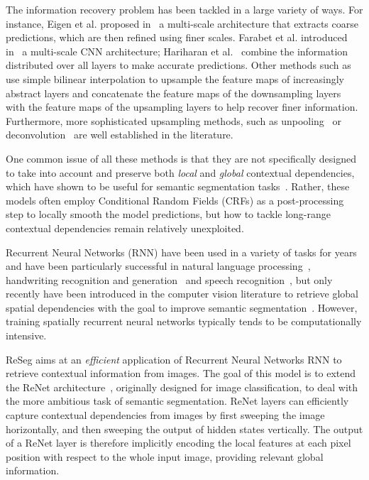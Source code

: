The information recovery problem has been tackled in a large variety of ways.
For instance, Eigen et al. proposed in~\cite{Eigen2015} a multi-scale
architecture that extracts coarse predictions, which are then refined using
finer scales. Farabet et al. introduced in~\cite{Farabet:2013} a multi-scale
CNN architecture; Hariharan et al.~\cite{Hariharan2015} combine the information
distributed over all layers to make accurate predictions. Other methods such
as~\cite{long2014fully,badrinarayanan2015segnet} use simple bilinear
interpolation to upsample the feature maps of increasingly abstract layers and
\cite{Ronneberger2015} concatenate the feature maps of the downsampling layers
with the feature maps of the upsampling layers to help recover finer
information. Furthermore, more sophisticated upsampling methods, such as
unpooling~\cite{noh2015learning,badrinarayanan2015segnet} or
deconvolution~\cite{long2014fully} are well established in the literature.

One common issue of all these methods is that they are not specifically
designed to take into account and preserve both \emph{local} and \emph{global}
contextual dependencies, which have shown to be useful for semantic
segmentation tasks~\cite{Singh2013,Gatta14-deepvision}. Rather, these models
often employ Conditional Random Fields (CRFs) as a post-processing step to
locally smooth the model predictions, but how to tackle long-range contextual
dependencies remain relatively unexploited.

Recurrent Neural Networks (RNN) have been used in a variety of tasks for years
and have been particularly successful in natural language
processing~\citep[see, e.g.,][]{Mikolov-thesis-2012,Sutskever-et-al-NIPS2014,
Cho2014}, handwriting recognition and generation~\citep{Graves+Schmidhuber-2009,
Graves-et-al-NIPS2007,Graves-arxiv2013} and speech recognition~\citep{
Chorowski-et-al-arxiv2014,Graves+Jaitly-ICML2014},
but only recently have been introduced in the computer vision literature to
retrieve global spatial dependencies with the goal to improve semantic
segmentation~\cite{Pinheiro:2014, Gatta14-deepvision, chen2015semantic,
byeon2015scene}. However, training spatially recurrent neural networks
typically tends to be computationally intensive.

ReSeg aims at an {\em efficient} application of Recurrent Neural
Networks RNN to retrieve contextual information from images. The goal of this
model is to extend the ReNet architecture~\cite{visin2015renet}, originally
designed for image classification, to deal with the more ambitious task of
semantic segmentation. ReNet layers can efficiently capture contextual
dependencies from images by first sweeping the image horizontally, and then
sweeping the output of hidden states vertically. The output of a ReNet layer
is therefore implicitly encoding the local features at each pixel position with
respect to the whole input image, providing relevant global information.


